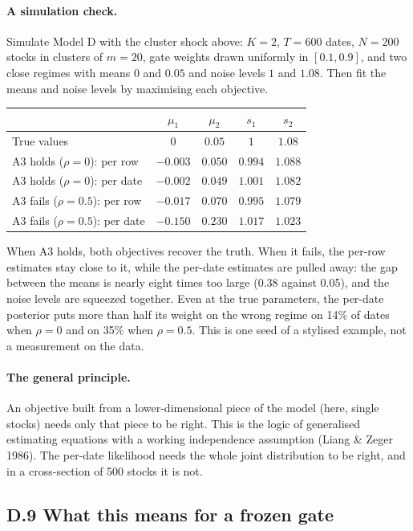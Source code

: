 \paragraph{A simulation check.} Simulate Model D with the cluster shock above: $K=2$, $T=600$ dates, $N=200$ stocks in clusters of $m=20$, gate weights drawn uniformly in $[0.1,0.9]$, and two close regimes with means $0$ and $0.05$ and noise levels $1$ and $1.08$. Then fit the means and noise levels by maximising each objective.
\begin{center}
\small\renewcommand{\arraystretch}{1.25}
\begin{tabular}{@{}lcccc@{}}
\toprule
 & $\mu_1$ & $\mu_2$ & $s_1$ & $s_2$ \\
\midrule
True values & $0$ & $0.05$ & $1$ & $1.08$ \\
A3 holds ($\rho=0$): per row & $-0.003$ & $0.050$ & $0.994$ & $1.088$ \\
A3 holds ($\rho=0$): per date & $-0.002$ & $0.049$ & $1.001$ & $1.082$ \\
A3 fails ($\rho=0.5$): per row & $-0.017$ & $0.070$ & $0.995$ & $1.079$ \\
A3 fails ($\rho=0.5$): per date & $-0.150$ & $0.230$ & $1.017$ & $1.023$ \\
\bottomrule
\end{tabular}
\end{center}
When A3 holds, both objectives recover the truth. When it fails, the per-row estimates stay close to it, while the per-date estimates are pulled away: the gap between the means is nearly eight times too large (0.38 against 0.05), and the noise levels are squeezed together. Even at the true parameters, the per-date posterior puts more than half its weight on the wrong regime on 14\% of dates when $\rho=0$ and on 35\% when $\rho=0.5$. This is one seed of a stylised example, not a measurement on the data.

\paragraph{The general principle.} An objective built from a lower-dimensional piece of the model (here, single stocks) needs only that piece to be right. This is the logic of generalised estimating equations with a working independence assumption (Liang \& Zeger 1986). The per-date likelihood needs the whole joint distribution to be right, and in a cross-section of 500 stocks it is not.

\subsection*{D.9 What this means for a frozen gate}


